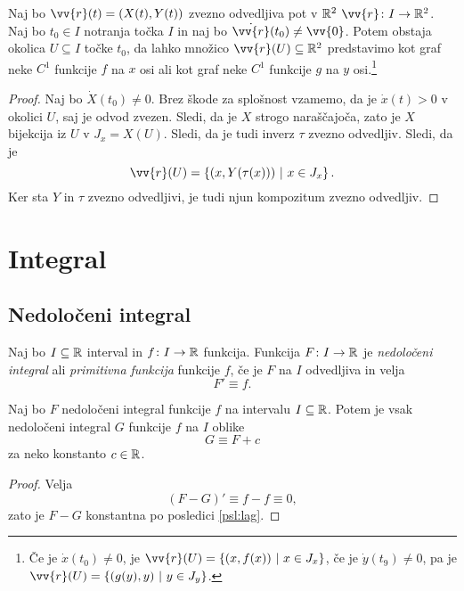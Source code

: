 \documentclass[12pt, a4paper]{article}
\begin{document}
\begin{izrek}
Naj bo $\vv{r}(t)=\left(X(t),Y(t)\right)$ zvezno odvedljiva pot v $\mathbb{R}^2$ $\vv{r}\colon I\to\R^2$. Naj bo $t_0\in I$ notranja točka $I$ in naj bo $\dot{\vv{r}}(t_0)\ne\vv{0}$. Potem obstaja okolica $U\subseteq I$ točke $t_0$, da lahko množico $\vv{r}(U)\subseteq\R^2$ predstavimo kot graf neke $C^1$ funkcije $f$ na $x$ osi ali kot graf neke $C^1$ funkcije $g$ na $y$ osi.\footnote{Če je $\dot{x}(t_0)\ne 0$, je $\vv{r}(U)=\setb{(x,f(x))}{x\in J_x}$, če je $\dot{y}(t_9)\ne 0$, pa je $\vv{r}(U)=\setb{(g(y),y)}{y\in J_y}$.}
\end{izrek}

\begin{proof}
Naj bo $\dot{X}(t_0)\ne 0$. Brez škode za splošnost vzamemo, da je $\dot{x}(t)>0$ v okolici $U$, saj je odvod zvezen. Sledi, da je $X$ strogo naraščajoča, zato je $X$ bijekcija iz $U$ v $J_x=X(U)$. Sledi, da je tudi inverz $\tau$ zvezno odvedljiv. Sledi, da je
\[
\vv{r}(U)=\setb{\left(x,Y(\tau(x))\right)}{x\in J_x}.
\]
Ker sta $Y$ in $\tau$ zvezno odvedljivi, je tudi njun kompozitum zvezno odvedljiv.
\end{proof}

\newpage

\section{Integral}

\subsection{Nedoločeni integral}

\begin{okvir}
\begin{definicija}
Naj bo $I\subseteq\mathbb{R}$ interval in $f\colon I\to\mathbb{R}$ funkcija. Funkcija $F\colon I\to\mathbb{R}$ je \emph{nedoločeni integral} ali \emph{primitivna funkcija} funkcije $f$, če je $F$ na $I$ odvedljiva in velja
\[
F'\equiv f.
\]
\end{definicija}
\end{okvir}

\begin{trditev}
Naj bo $F$ nedoločeni integral funkcije $f$ na intervalu $I\subseteq\mathbb{R}$. Potem je vsak nedoločeni integral $G$ funkcije $f$ na $I$ oblike
\[
G\equiv F+c
\]
za neko konstanto $c\in\mathbb{R}$.
\end{trditev}

\begin{proof}
Velja
\[
(F-G)'\equiv f-f\equiv 0,
\]
zato je $F-G$ konstantna po posledici \ref{psl:lag}.
\end{proof}
\end{document}
